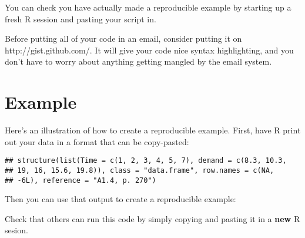 You can check you have actually made a reproducible example by starting
up a fresh R session and pasting your script in.

Before putting all of your code in an email, consider putting it on
http://gist.github.com/. It will give your code nice syntax
highlighting, and you don't have to worry about anything getting mangled
by the email system.

\hypertarget{example}{%
\section{Example}\label{example}}

Here's an illustration of how to create a reproducible example. First,
have R print out your data in a format that can be copy-pasted:

\begin{Shaded}
\begin{Highlighting}[]
\end{Highlighting}
\end{Shaded}

\begin{verbatim}
## structure(list(Time = c(1, 2, 3, 4, 5, 7), demand = c(8.3, 10.3, 
## 19, 16, 15.6, 19.8)), class = "data.frame", row.names = c(NA, 
## -6L), reference = "A1.4, p. 270")
\end{verbatim}

Then you can use that output to create a reproducible example:

\begin{Shaded}
\begin{Highlighting}[]

\StringTok{ }\NormalTok{(}\NormalTok{(} \NormalTok{(}\NormalTok{, }\NormalTok{, }\NormalTok{, }\NormalTok{, }\NormalTok{, }\NormalTok{), } \NormalTok{(}\NormalTok{, }\NormalTok{,}
\NormalTok{, }\NormalTok{, }\NormalTok{, }\NormalTok{)), } \NormalTok{(}\NormalTok{, }\NormalTok{), } \NormalTok{(}\NormalTok{,}
\OperatorTok{-} \NormalTok{, } \NormalTok{)}

\NormalTok{(}\OperatorTok{+}\StringTok{ }\NormalTok{()}
\end{Highlighting}
\end{Shaded}

Check that others can run this code by simply copying and pasting it in
a \textbf{new} R sesion.
